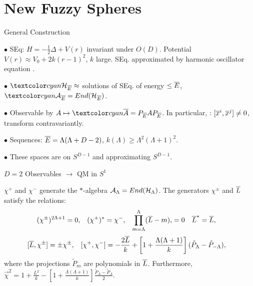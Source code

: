 \section{New Fuzzy Spheres}

\begin{frame}{General Construction} %
    
    $\bullet$  SEq: $H = - \frac{1}{2} \Delta + V(r)$ invariant under $O(D)$. Potential $V(r) \approx V_0 + 2k(r-1)^2$, $k$ large. SEq. approximated by harmonic oscillator equation \then {}.
    
    $\bullet$ $\lbtext{\hcal_{\cut E}} \approx $ solutions of SEq. of energy $\leq \overline{E}$, $\lbtext{\acal_{\cut E}} = End(\hcal_{\cut E})$.
    
    $\bullet$ Observable by $A \mapsto \lbtext{\cut A} = P_{\cut E} A P_{\cut E}$. In particular, : $[\overline{x}^i, \overline{x}^j] \neq 0$, transform contravariantly.
    
    $\bullet$ Sequences: $\overline{E} = \Lambda(\Lambda + D - 2)$, $k(\Lambda) \geq \Lambda^2 (\Lambda + 1)^2$.
    
    $\bullet$ These spaces are  on $S^{D-1}$ and  approximating $S^{D-1}$.
    
\end{frame}

\begin{frame}{$D = 2$ Observables $\to$ QM in $S^1$} %
    
    $\chi^+$ and $\chi^-$ generate the $*$-algebra $\mathcal A_\Lambda = End(\mathcal H_\Lambda)$. The generators $\chi^\pm$ and $\overline{L}$ satisfy the relations:
\begin{align}\label{equationOperatorFormulaRelationsChiD2}
    (\chi^\pm)^{2\Lambda+1} &= 0, & 
    (\chi^+)^*&= \chi^-, & 
    \prod_{m = \Lambda}^\Lambda (\overline{L} - m), &= 0 & 
    \overline{L}^* &= \overline{L},
\end{align}
\begin{align}\label{equationOperatorFormulaCommutatorsChiD2}
    [\overline{L}, \chi^\pm] &= \pm \chi^\pm,&
    [\chi^+, \chi^-] &= - \frac{2\overline{L}}{k} + \left[ 1 + \frac{\Lambda(\Lambda+1)}{k}\right](\tilde P_\Lambda - \tilde P_{-\Lambda}),
\end{align}
where the projections $\tilde P_m$ are polynomials in $\overline{L}$. Furthermore,
$\label{equationOperatorFormulaRChiD2}
    \vec \chi^2 = 1 + \frac{L^2}{k} - \left[ 1 + \frac{\Lambda(\Lambda+1)}{k}\right]\frac{\tilde P_\Lambda - \tilde P_\Lambda}{2}.
$

\end{frame}

